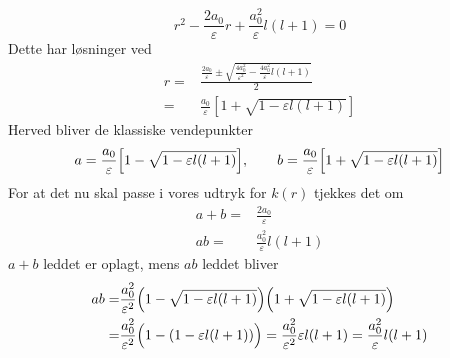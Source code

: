 \begin{equation}
  r^2 - \frac{2a_0}{\varepsilon}r + \frac{a_0^2}{\varepsilon}l(l+1) = 0
\end{equation}
Dette har løsninger ved
\begin{align}
  r = & \frac{\frac{2a_0}{\varepsilon} \pm \sqrt{\frac{4a_0^2}{\varepsilon^2} - \frac{4a_0^2}{\varepsilon}l(l+1)   }  }{2}\\
    = & \frac{a_0}{\varepsilon}[1+\sqrt{1-\varepsilon l(l+1)}]
\end{align}
Herved bliver de klassiske vendepunkter
\begin{align}
  a =  \frac{a_0}{\varepsilon}\Bigl[1-\sqrt{1-\varepsilon l(l+1)}  \Bigr],\qquad b =  \frac{a_0}{\varepsilon}\Bigl[1+\sqrt{1-\varepsilon l(l+1)}  \Bigr]
\end{align}
For at det nu skal passe i vores udtryk for $k(r)$ tjekkes det om
\begin{align}
  a+b = & \frac{2a_0}{\varepsilon} \\
  ab  = & \frac{a_0^2}{\varepsilon} l(l+1)
\end{align}
$a+b$ leddet er oplagt, mens $ab$ leddet bliver
\begin{align}
  ab = & \frac{a_0^2}{\varepsilon^2}\Bigl(1-\sqrt{1-\varepsilon l(l+1)} \Bigr)\Bigl(1+\sqrt{1-\varepsilon l(l+1)} \Bigr)\\
     = & \frac{a_0^2}{\varepsilon^2}\Bigl(1-(1-\varepsilon l(l+1)) \Bigr) =  \frac{a_0^2}{\varepsilon^2} \varepsilon l(l+1)
     = \frac{a_0^2}{\varepsilon} l(l+1)
\end{align}

